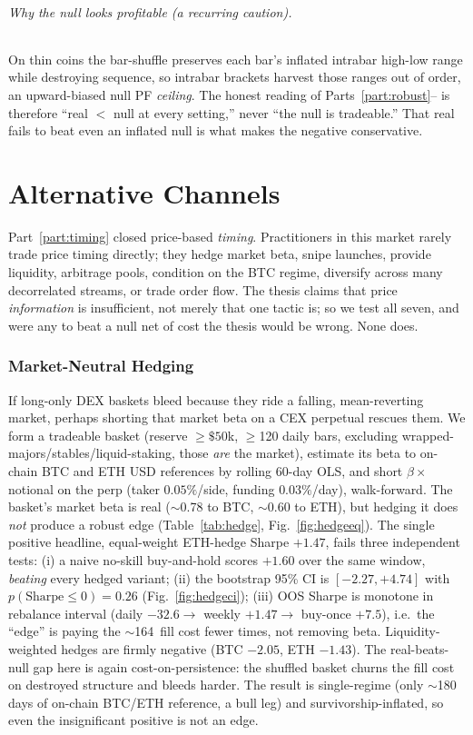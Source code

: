 \documentclass[12pt]{article}
\newcommand{\bp}{\,\text{bp}}
\begin{document}
\paragraph{Why the null looks profitable (a recurring caution).} On thin coins the bar-shuffle preserves each bar's inflated intrabar high-low range while destroying sequence, so intrabar brackets harvest those ranges out of order, an upward-biased null PF \emph{ceiling}. The honest reading of Parts~\ref{part:robust}--\ref{part:alt} is therefore ``real $<$ null at every setting,'' never ``the null is tradeable.'' That real fails to beat even an inflated null is what makes the negative conservative.

\part{Alternative Channels}\label{part:alt}
\noindent Part~\ref{part:timing} closed price-based \emph{timing}. Practitioners in this market rarely trade price timing directly; they hedge market beta, snipe launches, provide liquidity, arbitrage pools, condition on the BTC regime, diversify across many decorrelated streams, or trade order flow. The thesis claims that price \emph{information} is insufficient, not merely that one tactic is; so we test all seven, and were any to beat a null net of cost the thesis would be wrong. None does.

\section{Market-Neutral Hedging}\label{sec:hedge}
If long-only DEX baskets bleed because they ride a falling, mean-reverting market, perhaps shorting that market beta on a CEX perpetual rescues them. We form a tradeable basket (reserve $\geq\$50$k, $\geq$120 daily bars, excluding wrapped-majors/stables/liquid-staking, those \emph{are} the market), estimate its beta to on-chain BTC and ETH USD references by rolling 60-day OLS, and short $\beta\times$notional on the perp (taker $0.05\%$/side, funding $0.03\%$/day), walk-forward. The basket's market beta is real ($\sim$0.78 to BTC, $\sim$0.60 to ETH), but hedging it does \emph{not} produce a robust edge (Table~\ref{tab:hedge}, Fig.~\ref{fig:hedgeeq}). The single positive headline, equal-weight ETH-hedge Sharpe $+1.47$, fails three independent tests: (i) a naive no-skill buy-and-hold scores $+1.60$ over the same window, \emph{beating} every hedged variant; (ii) the bootstrap 95\% CI is $[-2.27,+4.74]$ with $p(\text{Sharpe}\leq0)=0.26$ (Fig.~\ref{fig:hedgeci}); (iii) OOS Sharpe is monotone in rebalance interval (daily $-32.6 \to$ weekly $+1.47 \to$ buy-once $+7.5$), i.e.\ the ``edge'' is paying the $\sim$164\bp{} fill cost fewer times, not removing beta. Liquidity-weighted hedges are firmly negative (BTC $-2.05$, ETH $-1.43$). The real-beats-null gap here is again cost-on-persistence: the shuffled basket churns the fill cost on destroyed structure and bleeds harder. The result is single-regime (only $\sim$180 days of on-chain BTC/ETH reference, a bull leg) and survivorship-inflated, so even the insignificant positive is not an edge.
\end{document}
